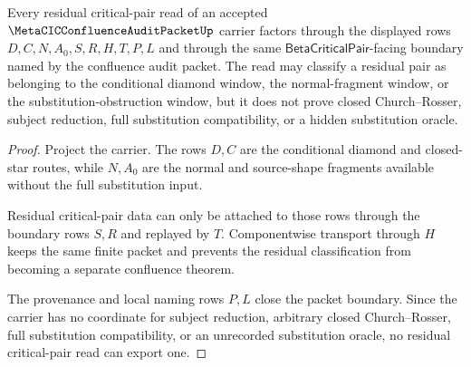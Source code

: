 \begin{theorem}
\label{thm:metacic-confluence-audit-residual-critical-pair-boundary}
Every residual critical-pair read of an accepted $\MetaCICConfluenceAuditPacketUp$ carrier factors through the displayed rows $D,C,N,A_0,S,R,H,T,P,L$ and through the same $\mathsf{BetaCriticalPair}$-facing boundary named by the confluence audit packet. The read may classify a residual pair as belonging to the conditional diamond window, the normal-fragment window, or the substitution-obstruction window, but it does not prove closed Church--Rosser, subject reduction, full substitution compatibility, or a hidden substitution oracle.
\end{theorem}
\begin{proof}
Project the carrier. The rows $D,C$ are the conditional diamond and closed-star routes, while $N,A_0$ are the normal and source-shape fragments available without the full substitution input.

Residual critical-pair data can only be attached to those rows through the boundary rows $S,R$ and replayed by $T$. Componentwise transport through $H$ keeps the same finite packet and prevents the residual classification from becoming a separate confluence theorem.

The provenance and local naming rows $P,L$ close the packet boundary. Since the carrier has no coordinate for subject reduction, arbitrary closed Church--Rosser, full substitution compatibility, or an unrecorded substitution oracle, no residual critical-pair read can export one.
\end{proof}

